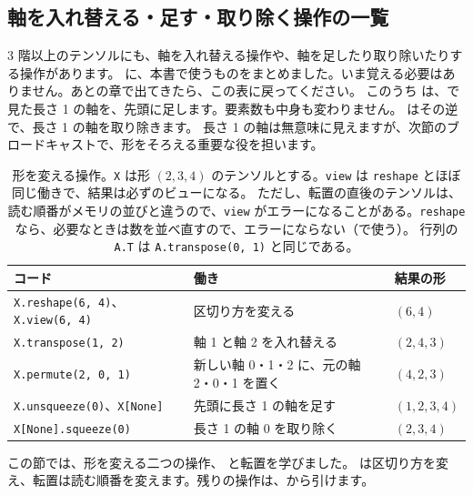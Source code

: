 \subsection*{軸を入れ替える・足す・取り除く操作の一覧}

3 階以上のテンソルにも、軸を入れ替える操作や、軸を足したり取り除いたりする操作があります。
に、本書で使うものをまとめました。いま覚える必要はありません。あとの章で出てきたら、この表に戻ってください。
このうち  は、で見た長さ 1 の軸を、先頭に足します。要素数も中身も変わりません。
 はその逆で、長さ 1 の軸を取り除きます。
長さ 1 の軸は無意味に見えますが、次節のブロードキャストで、形をそろえる重要な役を担います。

\begin{table}[tbp]
\centering
\caption{形を変える操作。\texttt{X} は形 $(2,3,4)$ のテンソルとする。\texttt{view} は \texttt{reshape} とほぼ同じ働きで、結果は必ずのビューになる。
ただし、転置の直後のテンソルは、読む順番がメモリの並びと違うので、\texttt{view} がエラーになることがある。\texttt{reshape} なら、必要なときは数を並べ直すので、エラーにならない（で使う）。
行列の \texttt{A.T} は \texttt{A.transpose(0, 1)} と同じである。}
\label{tab:pt-shape-ops}
\small
\begin{tabular}{@{}lll@{}}
\toprule
コード & 働き & 結果の形 \\
\midrule
\texttt{X.reshape(6, 4)}、\texttt{X.view(6, 4)} & 区切り方を変える & $(6,4)$ \\
\texttt{X.transpose(1, 2)} & 軸 1 と軸 2 を入れ替える & $(2,4,3)$ \\
\texttt{X.permute(2, 0, 1)} & 新しい軸 0・1・2 に、元の軸 2・0・1 を置く & $(4,2,3)$ \\
\texttt{X.unsqueeze(0)}、\texttt{X[None]} & 先頭に長さ 1 の軸を足す & $(1,2,3,4)$ \\
\texttt{X[None].squeeze(0)} & 長さ 1 の軸 0 を取り除く & $(2,3,4)$ \\
\bottomrule
\end{tabular}
\end{table}

この節では、形を変える二つの操作、 と転置を学びました。 は区切り方を変え、転置は読む順番を変えます。残りの操作は、から引けます。

